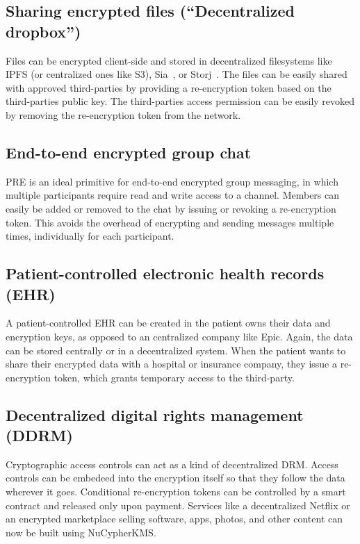 \documentclass[notitlepage,longbibliography]{revtex4-1}
\newcommand{\kms}{NuCypherKMS}
\begin{document}
\subsection{Sharing encrypted files (``Decentralized dropbox'')}
Files can be encrypted client-side and stored in decentralized filesystems like IPFS (or centralized ones like S3), Sia~\cite{web:sia}, or Storj~\cite{web:storj}.
The files can be easily shared with approved third-parties by providing a re-encryption token based on the third-parties
public key.
The third-parties access permission can be easily revoked by removing the re-encryption token from the network.

\subsection{End-to-end encrypted group chat}
PRE is an ideal primitive for end-to-end encrypted group messaging, in which multiple participants require read and write
access to a channel. Members can easily be added or removed to the chat by issuing or revoking a re-encryption token.
This avoids the overhead of encrypting and sending messages multiple times, individually for each participant.

\subsection{Patient-controlled electronic health records (EHR)}
A patient-controlled EHR can be created in the patient owns their data and encryption keys, as opposed to an centralized
company like Epic.
Again, the data can be stored centrally or in a decentralized system.
When the patient wants to share their encrypted data with a hospital or insurance company, they issue a re-encryption token,
which grants temporary access to the third-party.

\subsection{Decentralized digital rights management (DDRM)}
Cryptographic access controls can act as a kind of decentralized DRM.
Access controls can be embedeed into the encryption itself so that they follow the data wherever it goes.
Conditional re-encryption tokens can be controlled by a smart contract and released only upon payment.
Services like a decentralized Netflix or an encrypted marketplace selling software, apps, photos, and other content
can now be built using \kms.
\end{document}
